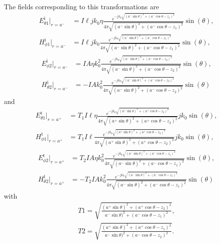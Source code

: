 \documentclass[journal,transaction]{IEEEtran}
\begin{document}
The fields corresponding to this transformations are
%
\begin{subequations}\label{Eq:double_field_in1}
\begin{align}
  E_{\theta1} ^\text{i}|_{r=a^-}& =I\ell jk_0\eta\frac{e^{-jk_0\sqrt{(a^-\sin\theta)^2+(a^-\cos\theta-z_1)^2}}}{4\pi \sqrt{(a^-\sin\theta)^2+(a^-\cos\theta-z_1)^2}}\sin(\theta),\\
  H_{\phi1}^\text{i}|_{r=a^-} & =I\ell jk_0\frac{e^{-jk_0\sqrt{(a^-\sin\theta)^2+(a^-\cos\theta-z_1)^2}}}{4\pi \sqrt{(a^-\sin\theta)^2+(a^-\cos\theta-z_1)^2}}\sin(\theta),
\end{align}
\end{subequations}
\begin{subequations}\label{Eq:double_field_in2}
\begin{align}
  E_{\phi2}^\text{i}|_{r=a^-} & =IA\eta k_0^2\frac{e^{-jk_0\sqrt{(a^-\sin\theta)^2+(a^-\cos\theta-z_2)^2}}}{4\pi \sqrt{(a^-\sin\theta)^2+(a^-\cos\theta-z_2)^2}}\sin(\theta),\\
  H_{\theta2}^\text{i} |_{r=a^-}& =-IAk_0^2\frac{e^{-jk_0\sqrt{(a^-\sin\theta)^2+(a^-\cos\theta-z_2)^2}}}{4\pi\sqrt{(a^-\sin\theta)^2+(a^-\cos\theta-z_2)^2}}\sin(\theta)
\end{align}
\end{subequations}
%
and
%
\begin{subequations}\label{Eq:double_field_out1}
\begin{align}
  E_{\theta1}^\text{t}|_{r=a^+}& =T_1I\ell\eta\frac{e^{-jk_0\sqrt{(a^+\sin\theta)^2+(a^+\cos\theta-z_2)^2}}}{4\pi \sqrt{(a^+\sin\theta)^2+(a^+\cos\theta-z_2)^2}}jk_0\sin(\theta),\\
  H_{\phi1}^\text{t}|_{r=a^+}& =T_1I\ell\frac{e^{-jk_0\sqrt{(a^+\sin\theta)^2+(a^+\cos\theta-z_2)^2}}}{4\pi \sqrt{(a^+\sin\theta)^2+(a^+\cos\theta-z_2)^2}}jk_0\sin(\theta),
\end{align}
\end{subequations}
\begin{subequations}\label{Eq:double_field_out2}
\begin{align}
  E_{\phi2}^\text{t}|_{r=a^+}& =T_2IA\eta k_0^2\frac{e^{-jk_0\sqrt{(a^-\sin\theta)^2+(a^-\cos\theta-z_1)^2}}}{4\pi \sqrt{(a^-\sin\theta)^2+(a^-\cos\theta-z_1)^2}}\sin(\theta),\\
  H_{\theta2}^\text{t}|_{r=a^+}& =-T_2IAk_0^2\frac{e^{-jk_0\sqrt{(a^-\sin\theta)^2+(a^-\cos\theta-z_1)^2}}}{4\pi\sqrt{(a^-\sin\theta)^2+(a^-\cos\theta-z_1)^2}}\sin(\theta)
\end{align}
\end{subequations}
%
with
%
\begin{subequations}
\begin{align}
T1=\sqrt{\frac{(a^+\sin\theta)^2+(a^+\cos\theta-z_2)^2}{a^-\sin\theta)^2+(a^-\cos\theta-z_1)^2}},\\
T2=\sqrt{\frac{(a^+\sin\theta)^2+(a^+\cos\theta-z_1)^2}{a^-\sin\theta)^2+(a^-\cos\theta-z_2)^2}}.
\end{align}
\end{subequations}
\end{document}
